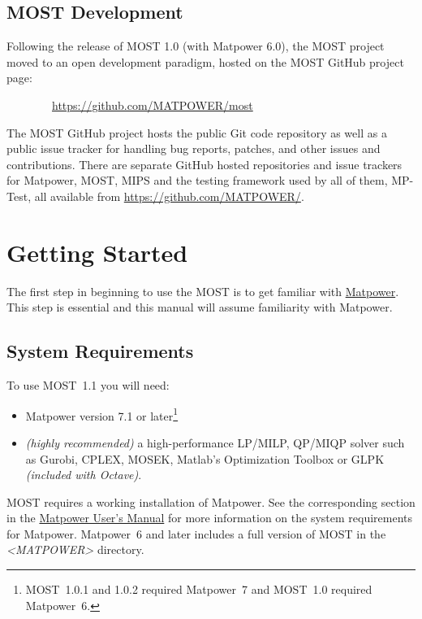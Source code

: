 \documentclass[12pt]{article}
\newcommand{\mpver}[0]{7.1}
\newcommand{\matlab}[0]{{\sc Matlab}}
\newcommand{\matpower}[0]{{\sc Matpower}}
\newcommand{\matpowerurl}[0]{https://matpower.org}
\newcommand{\matpowerlink}[0]{\href{\matpowerurl}{\matpower{}}}
\newcommand{\mptest}[0]{{MP-Test}}
\newcommand{\mips}[0]{{MIPS}}
\newcommand{\most}[0]{{MOST}}
\newcommand{\mosturl}[0]{https://github.com/MATPOWER/most}
\newcommand{\mostver}[0]{1.1}
\newcommand{\cplex}[0]{{CPLEX}}
\newcommand{\glpk}[0]{{GLPK}}
\newcommand{\gurobi}[0]{{Gurobi}}
\newcommand{\mosek}[0]{{MOSEK}}
\newcommand{\ot}[0]{{Optimization Toolbox}}
\newcommand{\code}[1]{{\relsize{-0.5}{\tt{{#1}}}}}  %
\newcommand{\mppath}[1]{\textsf{\textsl{{\relsize{-1.0}\textless{}\mbox{MATPOWER}\textgreater{}}}}\code{{#1}}}  %
\newcommand{\mostpath}[1]{\mppath{}\code{/most{#1}}}
\newcommand{\mumurl}[0]{https://matpower.org/docs/MATPOWER-manual-\mpver.pdf}
\newcommand{\mum}[0]{\href{\mumurl}{\matpower{} User's Manual}}
\numberwithin{equation}{section}
\numberwithin{table}{section}
\numberwithin{figure}{section}
\begin{document}
\subsection{\most{} Development}
\label{sec:development}

Following the release of \most{} 1.0 (with \matpower{} 6.0), the \most{} project moved to an open development paradigm, hosted on the \most{} GitHub project page:

\bigskip

~~~~~~~~\url{\mosturl}

\bigskip

The \most{} GitHub project hosts the public Git code repository as well as a public issue tracker for handling bug reports, patches, and other issues and contributions. There are separate GitHub hosted repositories and issue trackers for \matpower{}, \most{}, \mips{} and the testing framework used by all of them, \mptest{}, all available from \url{https://github.com/MATPOWER/}.


\clearpage
\section{Getting Started}

The first step in beginning to use the \most{} is to get familiar with \matpowerlink{}. This step is essential and this manual will assume familiarity with \matpower{}.

\subsection{System Requirements}
\label{sec:sysreq}
To use \most{}~\mostver{} you will need:
\begin{itemize}
\item \matpower{} version 7.1 or later\footnote{\most{}~1.0.1 and 1.0.2 required \matpower{}~7 and \most{}~1.0 required \matpower{}~6.}
\item \emph{(highly recommended)} a high-performance LP/MILP, QP/MIQP solver such as \gurobi{}, \cplex{}, \mosek{}, \matlab{}'s \ot{} or \glpk{} \emph{(included with Octave)}.
\end{itemize}

\most{} requires a working installation of \matpower{}. See the corresponding section in the \mum{} for more information on the system requirements for \matpower{}.
\matpower{}~6 and later includes a full version of \most{} in the \mostpath{} directory.
\end{document}
